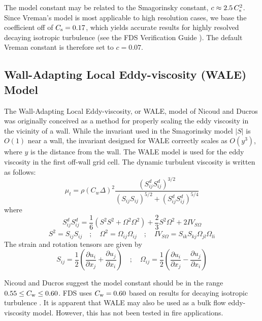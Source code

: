 The model constant may be related to the Smagorinsky constant, $c \approx 2.5 \, C_{\rm s}^2$.  Since Vreman's model is most applicable to high resolution cases, we base the coefficient off of $C_{\rm s} = 0.17$, which yields accurate results for highly resolved decaying isotropic turbulence (see the FDS Verification Guide \cite{FDS_Verification_Guide}).  The default Vreman constant is therefore set to $c = 0.07$.

\subsection{Wall-Adapting Local Eddy-viscosity (WALE) Model}
\label{sec:wale}

The Wall-Adapting Local Eddy-viscosity, or WALE, model of Nicoud and Ducros \cite{Nicoud:1999} was originally conceived as a method for properly scaling the eddy viscosity in the vicinity of a wall.  While the invariant used in the Smagorinsky model $|S|$ is $O(1)$ near a wall, the invariant designed for WALE correctly scales as $O(y^3)$, where $y$ is the distance from the wall.  The WALE model is used for the eddy viscosity in the first off-wall grid cell.  The dynamic turbulent viscosity is written as follows:
\begin{equation}
\label{eq:wale}
\mu_{\unit{t}} = \rho (C_{\unit{w}} \Delta)^2 \frac{(S^d_{ij} S^d_{ij})^{3/2}}{(S_{ij} S_{ij})^{5/2} + (S^d_{ij} S^d_{ij})^{5/4}}
\end{equation}
where
\begin{equation}
S^d_{ij} S^d_{ij} = \frac{1}{6} \left(S^2 S^2 + \Omega^2 \Omega^2\right) + \frac{2}{3} S^2 \Omega^2 + 2 {IV}_{S\Omega}
\end{equation}
\begin{equation*}
S^2 = S_{ij} S_{ij} \quad ; \quad \Omega^2 = \Omega_{ij} \Omega_{ij} \quad ; \quad {IV}_{S\Omega} = S_{ik}S_{kj}\Omega_{jl}\Omega_{li}
\end{equation*}
The strain and rotation tensors are given by
\begin{equation}
S_{ij} = \frac{1}{2} \left( \frac{\partial u_i}{\partial x_j} + \frac{\partial u_j}{\partial x_i} \right) \quad ; \quad \Omega_{ij} = \frac{1}{2} \left( \frac{\partial u_i}{\partial x_j} - \frac{\partial u_j}{\partial x_i} \right)
\end{equation}

Nicoud and Ducros \cite{Nicoud:1999} suggest the model constant should be in the range $0.55 \le C_{\rm w} \le 0.60$.  FDS uses $C_{\rm w} = 0.60$ based on results for decaying isotropic turbulence \cite{FDS_Verification_Guide}.  It is apparent that WALE may also be used as a bulk flow eddy-viscosity model.  However, this has not been tested in fire applications.

